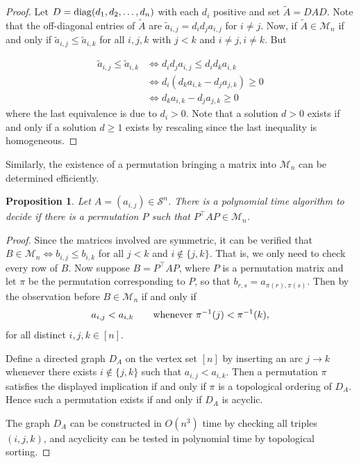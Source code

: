 \documentclass{amsart}
\def\diag{{\rm diag}}
\newcommand{\cM}{\mathcal{M}}
\newcommand{\cS}{\mathcal{S}}
\newtheorem{proposition}[theorem]{Proposition}
\theoremstyle{definition}
\begin{document}
\begin{proof}
Let $D = \diag(d_1,d_2,\ldots, d_n)$ with each $d_i$ positive and set $\tilde{A}  = DAD$. Note that the off-diagonal entries of $\tilde{A}$ are $\tilde{a}_{i,j} = d_id_j a_{i,j}$ for $i \neq j$. Now, if $\tilde{A} \in \cM_n$ if and only if $\tilde{a}_{i,j} \leq \tilde{a}_{i,k}$ for all $i,j,k$ with $j < k$ and $i\neq j, i\neq k$. But

\[\begin{aligned}
\tilde{a}_{i,j} \leq \tilde{a}_{i,k} &\iff d_id_ja_{i,j} \leq d_id_ka_{i,k}\\
&\iff d_i(d_ka_{i,k} - d_ja_{j,k}) \geq 0\\
&\iff d_ka_{i,k} - d_ja_{j,k} \geq 0
\end{aligned}\]
%
where the last equivalence is due to $d_i > 0$. Note that a solution $d>0$ exists if and only if a solution $d\geq 1$ exists by rescaling since the last inequality is homogeneous. 
\end{proof}

Similarly, the existence of a permutation bringing a matrix into $\cM_n$ can be determined efficiently. 

\begin{proposition}\label{prop:Permutation_into_Mn}
Let $A = (a_{i,j}) \in \cS^n$. There is a polynomial time algorithm to decide if there is a permutation $P$ such that $P^\top A P \in \cM_n$.   
\end{proposition}

\begin{proof}
    Since the matrices involved are symmetric, it can be verified that $B\in \mathcal{M}_n \iff
    b_{i,j} \leq b_{i,k}$ for all $j < k$ and $i \not \in \{j,k\}.$ That is, we only need to check every row of $B$.
    Now suppose $B =P^{\top}AP$, where $P$ is a permutation matrix and let $\pi$ be the permutation corresponding to $P$, so that  $b_{r,s} =a_{\pi(r),\pi(s)}$. Then by the observation before $B \in \mathcal{M}_n$ if and only if $$a_{i,j} < a_{i,k}\qquad\textup{whenever } \pi^{-1}(j)< \pi^{-1}(k),$$
    for all distinct $i,j,k\in [n]$. 

    Define a directed graph $D_A$ on the vertex set $[n]$ by inserting an arc
$j\to k$ whenever there exists $i\notin\{j,k\}$ such that $a_{i,j}<a_{i,k}$.
Then a permutation $\pi$ satisfies the displayed implication if and only if
$\pi$ is a topological ordering of $D_A$. Hence such a permutation exists if and only if $D_A$ is acyclic.

The graph $D_A$ can be constructed in $O(n^3)$ time by checking all triples $(i,j,k)$, and acyclicity can be tested in polynomial time by topological sorting.
\end{proof}
\end{document}
